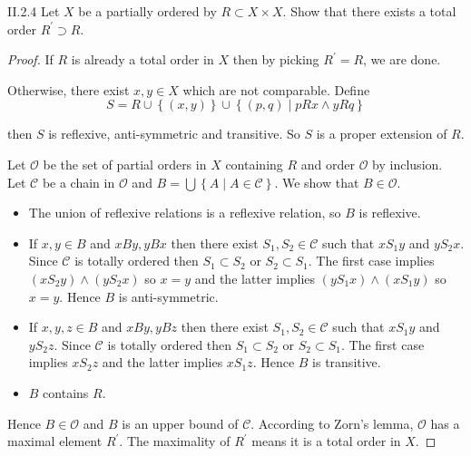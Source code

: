 \begin{problem}{II.2.4}
Let \(X\) be a partially ordered by \( R \subset X \times X \). Show that there exists a total order \( R^{\prime} \supset R \).
\end{problem}

\begin{proof}
	If \( R \) is already a total order in \( X \) then by picking \( R^{\prime} = R \), we are done.

	Otherwise, there exist \( x, y \in X \) which are not comparable. Define
	\[
		S = R \cup \left\{ (x, y) \right\} \cup \left\{ (p, q) \mid pRx \land yRq \right\}
	\]

	then \( S \) is reflexive, anti-symmetric and transitive. So \( S \) is a proper extension of \( R \).

	Let \( \mathcal{O} \) be the set of partial orders in \( X \) containing \( R \) and order \( \mathcal{O} \) by inclusion. Let \( \mathscr{C} \) be a chain in \( \mathcal{O} \) and \( B = \bigcup \left\{ A \mid A \in \mathscr{C} \right\} \). We show that \( B \in \mathcal{O} \).
	\begin{itemize}[itemsep=0pt]
		\item The union of reflexive relations is a reflexive relation, so \( B \) is reflexive.
		\item If \( x, y \in B \) and \( x B y, y B x \) then there exist \( S_{1}, S_{2} \in \mathscr{C} \) such that \( x S_{1} y \) and \( y S_{2} x \). Since \( \mathscr{C} \) is totally ordered then \( S_{1} \subset S_{2} \) or \( S_{2} \subset S_{1} \). The first case implies \( (x S_{2} y) \land (y S_{2} x) \) so \( x = y \) and the latter implies \( (y S_{1} x) \land (x S_{1} y) \) so \( x = y \). Hence \( B \) is anti-symmetric.
		\item If \( x, y, z \in B \) and \( x B y, y B z \) then there exist \( S_{1}, S_{2} \in \mathscr{C} \) such that \( x S_{1} y \) and \( y S_{2} z \). Since \( \mathscr{C} \) is totally ordered then \( S_{1} \subset S_{2} \) or \( S_{2} \subset S_{1} \). The first case implies \( x S_{2} z \) and the latter implies \( x S_{1} z \). Hence \( B \) is transitive.
		\item \( B \) contains \( R \).
	\end{itemize}

	Hence \( B \in \mathcal{O} \) and \( B \) is an upper bound of \( \mathscr{C} \). According to Zorn's lemma, \( \mathcal{O} \) has a maximal element \( R^{\prime} \). The maximality of \( R^{\prime} \) means it is a total order in \( X \).
\end{proof}

